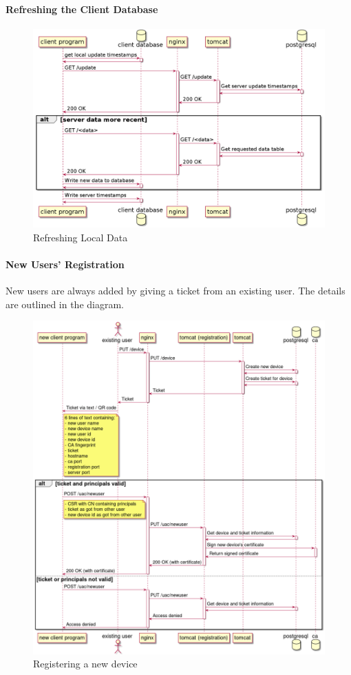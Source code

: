 \documentclass{memoir}
\begin{document}
\paragraph{Refreshing the Client Database\\}

\begin{figure}[!h]
\includegraphics[width=\linewidth]{diagrams/refresh-data.png}
\caption{Refreshing Local Data}
\end{figure}

\paragraph{New Users' Registration}
New users are always added by giving a ticket from an existing user. The details are outlined in the diagram.

\begin{figure}[!h]
\includegraphics[width=\linewidth]{diagrams/device-registration.png}
\caption{Registering a new device}
\end{figure}
\end{document}
